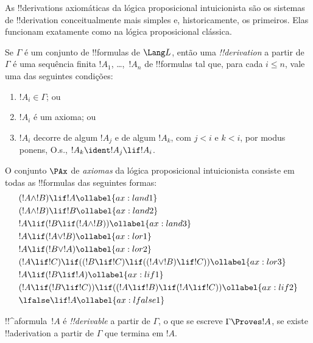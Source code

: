 \documentclass[../../../include/open-logic-section]{subfiles}
\begin{document}


As !!{derivation}s axiomáticas da lógica proposicional intuicionista
são os sistemas de !!{derivation} conceitualmente mais simples e,
historicamente, os primeiros. Elas funcionam exatamente como na lógica
proposicional clássica.

\begin{defn}[!!^{derivability}]
Se $\Gamma$ é um conjunto de !!{formula}s de $\Lang L$, então uma
\emph{!!{derivation}} a partir de $\Gamma$ é uma sequência finita
$!A_1$, \dots,~$!A_n$ de !!{formula}s tal que, para cada $i \le n$,
vale uma das seguintes condições:
\begin{enumerate}
\item $!A_i \in \Gamma$; ou
\item $!A_i$ é um axioma; ou
\item $!A_i$ decorre de algum $!A_j$ e de algum $!A_k$, com $j < i$ e
  $k < i$, por modus ponens, O.s.\@, $!A_k \ident !A_j \lif !A_i$.
\end{enumerate}
\end{defn}

\begin{defn}[Axiomas]
O conjunto $\PAx$ de \emph{axiomas} da lógica proposicional intuicionista
consiste em todas as !!{formula}s das seguintes formas:
\begin{align}
  & (!A \land !B) \lif !A \ollabel{ax:land1}\\
  & (!A \land !B) \lif !B \ollabel{ax:land2}\\
  & !A \lif (!B \lif (!A \land !B)) \ollabel{ax:land3}\\
  & !A \lif (!A \lor !B) \ollabel{ax:lor1}\\
  & !A \lif (!B \lor !A) \ollabel{ax:lor2}\\
  & (!A \lif !C) \lif ((!B \lif !C) \lif ((!A \lor !B) \lif !C)) \ollabel{ax:lor3}\\
  & !A \lif (!B \lif !A) \ollabel{ax:lif1}\\
  & (!A \lif (!B \lif !C)) \lif ((!A \lif !B) \lif (!A \lif !C)) \ollabel{ax:lif2}\\
  & \lfalse \lif !A \ollabel{ax:lfalse1}
\end{align}
\end{defn}

\begin{defn}[!!^{derivability}]
!!^a{formula}~$!A$ é \emph{!!{derivable}} a partir de $\Gamma$, o que
se escreve $\Gamma \Proves !A$, se existe !!a{derivation} a partir de
$\Gamma$ que termina em $!A$.
\end{defn}
\end{document}
